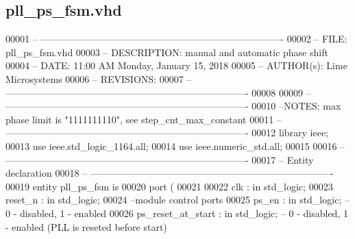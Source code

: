 \subsection{pll\+\_\+ps\+\_\+fsm.\+vhd}
\label{pll__ps__fsm_8vhd_source}

\begin{DoxyCode}
00001 \textcolor{keyword}{-- ----------------------------------------------------------------------------}
00002 \textcolor{keyword}{-- FILE:          pll\_ps\_fsm.vhd}
00003 \textcolor{keyword}{-- DESCRIPTION:   manual and automatic phase shift}
00004 \textcolor{keyword}{-- DATE:          11:00 AM Monday, January 15, 2018}
00005 \textcolor{keyword}{-- AUTHOR(s):     Lime Microsystems}
00006 \textcolor{keyword}{-- REVISIONS:}
00007 \textcolor{keyword}{-- ----------------------------------------------------------------------------}
00008 
00009 \textcolor{keyword}{-- ----------------------------------------------------------------------------}
00010 \textcolor{keyword}{--NOTES: max phase limit is "1111111110", see step\_cnt\_max\_constant}
00011 \textcolor{keyword}{-- ----------------------------------------------------------------------------}
00012 \textcolor{vhdlkeyword}{library }\textcolor{keywordflow}{ieee};
00013 \textcolor{vhdlkeyword}{use }ieee.std\_logic\_1164.\textcolor{keywordflow}{all};
00014 \textcolor{vhdlkeyword}{use }ieee.numeric\_std.\textcolor{keywordflow}{all};
00015 
00016 \textcolor{keyword}{-- ----------------------------------------------------------------------------}
00017 \textcolor{keyword}{-- Entity declaration}
00018 \textcolor{keyword}{-- ----------------------------------------------------------------------------}
00019 \textcolor{keywordflow}{entity }pll_ps_fsm \textcolor{keywordflow}{is}
00020    \textcolor{keywordflow}{port} \textcolor{vhdlchar}{(}
00021 
00022       \textcolor{vhdlchar}{clk}               \textcolor{vhdlchar}{:} \textcolor{keywordflow}{in} \textcolor{comment}{std\_logic};
00023       \textcolor{vhdlchar}{reset_n}           \textcolor{vhdlchar}{:} \textcolor{keywordflow}{in} \textcolor{comment}{std\_logic};
00024 \textcolor{keyword}{      --module control ports}
00025       \textcolor{vhdlchar}{ps_en}             \textcolor{vhdlchar}{:} \textcolor{keywordflow}{in} \textcolor{comment}{std\_logic};\textcolor{keyword}{ -- 0 - disabled, 1 - enabled}
00026       \textcolor{vhdlchar}{ps_reset_at_start} \textcolor{vhdlchar}{:} \textcolor{keywordflow}{in} \textcolor{comment}{std\_logic};\textcolor{keyword}{ -- 0 - disabled, 1 - enabled (PLL is reseted before start)}

\end{DoxyCode}
